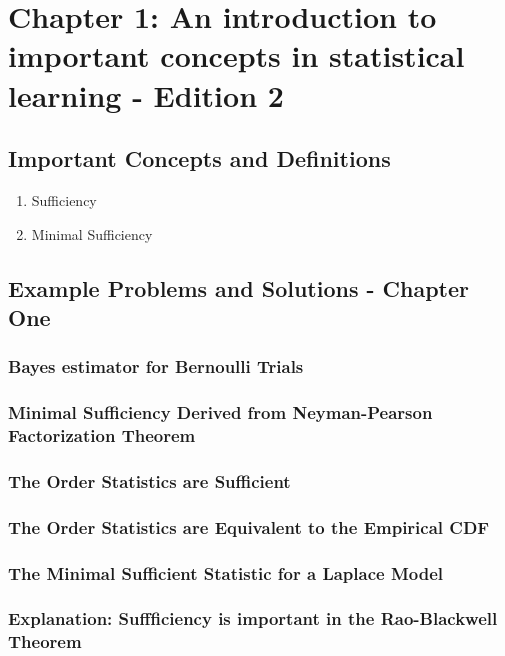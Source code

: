 
\section{Chapter 1: An introduction to important concepts in statistical learning - Edition 2}
  \label{sec:chapterone_v2}
  \subsection{Important Concepts and Definitions}
  	\begin{enumerate}
  		\item Sufficiency
  		\item Minimal Sufficiency
  	\end{enumerate}


  \subsection{Example Problems and Solutions - Chapter One}

		\subsubsection{Bayes estimator for Bernoulli Trials}

		\subsubsection{Minimal Sufficiency Derived from Neyman-Pearson Factorization Theorem}

		\subsubsection{The Order Statistics are Sufficient}

		\subsubsection{The Order Statistics are Equivalent to the Empirical CDF}

		\subsubsection{The Minimal Sufficient Statistic for a Laplace Model}

		\subsubsection{Explanation: Suffficiency is important in the Rao-Blackwell Theorem}